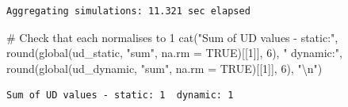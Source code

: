 \documentclass[
  letterpaper,
  DIV=11,
  numbers=noendperiod]{scrartcl}
\newenvironment{Shaded}{\begin{snugshade}}{\end{snugshade}}
\newcommand{\AttributeTok}[1]{\textcolor[rgb]{0.40,0.45,0.13}{#1}}
\newcommand{\CommentTok}[1]{\textcolor[rgb]{0.37,0.37,0.37}{#1}}
\newcommand{\ConstantTok}[1]{\textcolor[rgb]{0.56,0.35,0.01}{#1}}
\newcommand{\DecValTok}[1]{\textcolor[rgb]{0.68,0.00,0.00}{#1}}
\newcommand{\FunctionTok}[1]{\textcolor[rgb]{0.28,0.35,0.67}{#1}}
\newcommand{\NormalTok}[1]{\textcolor[rgb]{0.00,0.23,0.31}{#1}}
\newcommand{\SpecialCharTok}[1]{\textcolor[rgb]{0.37,0.37,0.37}{#1}}
\newcommand{\StringTok}[1]{\textcolor[rgb]{0.13,0.47,0.30}{#1}}
\begin{document}
\begin{verbatim}
Aggregating simulations: 11.321 sec elapsed
\end{verbatim}

\begin{Shaded}
\begin{Highlighting}[]
\CommentTok{\# Check that each normalises to 1}
\FunctionTok{cat}\NormalTok{(}\StringTok{"Sum of UD values {-} static:"}\NormalTok{,}
    \FunctionTok{round}\NormalTok{(}\FunctionTok{global}\NormalTok{(ud\_static, }\StringTok{"sum"}\NormalTok{, }\AttributeTok{na.rm =} \ConstantTok{TRUE}\NormalTok{)[[}\DecValTok{1}\NormalTok{]], }\DecValTok{6}\NormalTok{),}
    \StringTok{" dynamic:"}\NormalTok{,}
    \FunctionTok{round}\NormalTok{(}\FunctionTok{global}\NormalTok{(ud\_dynamic, }\StringTok{"sum"}\NormalTok{, }\AttributeTok{na.rm =} \ConstantTok{TRUE}\NormalTok{)[[}\DecValTok{1}\NormalTok{]], }\DecValTok{6}\NormalTok{), }\StringTok{"}\SpecialCharTok{\textbackslash{}n}\StringTok{"}\NormalTok{)}
\end{Highlighting}
\end{Shaded}

\begin{verbatim}
Sum of UD values - static: 1  dynamic: 1 
\end{verbatim}
\end{document}
